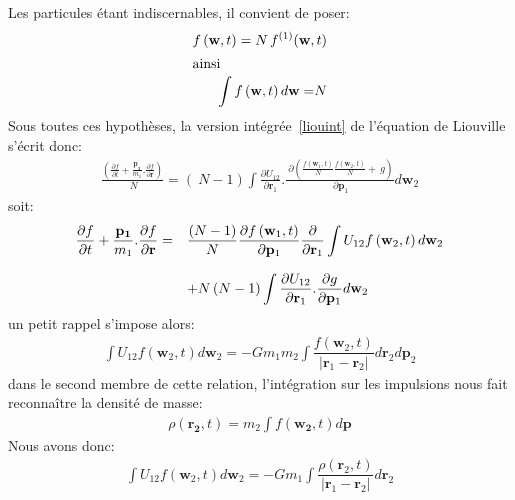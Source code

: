 Les particules étant indiscernables, il convient de poser:
\begin{align*}
	f\left(  \mathbf{w},t\right)  =N\,f^{(1)}(\mathbf{w},t) \\
	\intertext{ainsi}
	\int f\left(  \mathbf{w},t\right)  d\mathbf{w=}N
\end{align*}
Sous toutes ces hypothèses, la version intégrée~\ref{liouint} de l'équation de Liouville s'écrit donc:
\begin{align*}
	\frac{\left(  \frac{\partial f}{\partial t}+\frac{\mathbf{p_{1}}}{m_{1}}.\frac{\partial f}{\partial\mathbf{r}}\right)  }{{\ N}}=\left(  {\ N-1}%
	\right)  \displaystyle\int\tfrac{\partial U_{12}}{\partial\mathbf{r}_{1}}.\frac{{\ \partial}\left(  \frac{f\left(  \mathbf{w}_{1},t\right)  }{N}%
	\frac{f\left(  \mathbf{w}_{2},t\right)  }{N}+{\ g}\right)  }{{\ \partial}\mathbf{p}_{1}}d\mathbf{w}_{2}%
\end{align*}
soit:
\begin{align*}%
	\begin{array}[c]{ll}%
		\dfrac{\partial f}{\partial t}+\dfrac{\mathbf{p_{1}}}{m_{1}}.\dfrac{\partial f}{\partial\mathbf{r}}= & \dfrac{\left(  N-1\right)  }{N}\dfrac{\partial
		f\left(  \mathbf{w}_{1},t\right)  }{\partial\mathbf{p}_{1}}\dfrac{\partial}{\partial\mathbf{r}_{1}}\displaystyle\int U_{12}f\left(  \mathbf{w}%
		_{2},t\right)  d\mathbf{w}_{2}\\
		& \\
		& +N\left(  N-1\right)  \displaystyle\int\dfrac{\partial U_{12}}{\partial\mathbf{r}_{1}}.\dfrac{\partial g}{\partial\mathbf{p}_{1}}%
		d\mathbf{w}_{2}%
	\end{array}
\end{align*}
un petit rappel s'impose alors:
\begin{align*}
	\displaystyle\int U_{12}f\left(  \mathbf{w}_{2},t\right)  d\mathbf{w}_{2}=-Gm_{1}m_{2}\displaystyle\int\dfrac{f\left(  \mathbf{w}_{2},t\right)
	}{\left\vert \mathbf{r}_{1}-\mathbf{r}_{2}\right\vert }d\mathbf{r}_{2}d\mathbf{p}_{2}%
\end{align*}
dans le second membre de cette relation, l'intégration sur les impulsions nous fait reconnaître la densité de masse:
\begin{align*}
	\rho\left(  \mathbf{r_{2}},t\right)  =m_{2}\displaystyle\int f\left(\mathbf{w_{2}},t\right)  d\mathbf{p}%
\end{align*}
Nous avons donc:
\begin{align*}
	\displaystyle\int U_{12}f\left(  \mathbf{w}_{2},t\right)  d\mathbf{w}_{2}=-Gm_{1}\displaystyle\int\dfrac{\rho\left(  \mathbf{r}_{2},t\right)
	}{\left\vert \mathbf{r}_{1}-\mathbf{r}_{2}\right\vert }d\mathbf{r}_{2}%
\end{align*}
